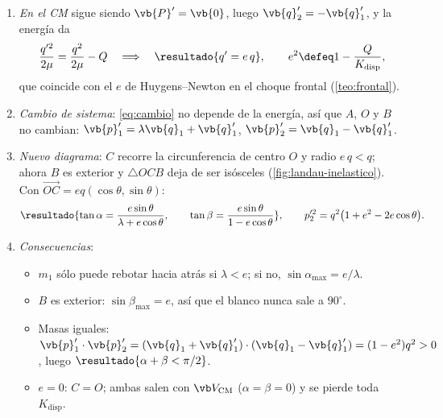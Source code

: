 \begin{resolucion}
\begin{enumerate}
  \item \emph{En el CM} sigue siendo $\vb{P}'=\vb{0}$, luego $\vb{q}_{2}'=-\vb{q}_{1}'$, y la energía da
        \[
          \frac{q'^{2}}{2\mu}=\frac{q^{2}}{2\mu}-Q
          \quad\Longrightarrow\quad
          \resultado{q'=e\,q},\qquad e^{2}\defeq1-\frac{Q}{K_{\mathrm{disp}}} ,
        \]
        que coincide con el $e$ de Huygens--Newton en el choque frontal (\cref{teo:frontal}).
  \item \emph{Cambio de sistema}: \eqref{eq:cambio} no depende de la energía, así que $A$, $O$ y $B$
        no cambian: $\vb{p}_{1}'=\lambda\vb{q}_{1}+\vb{q}_{1}'$, $\vb{p}_{2}'=\vb{q}_{1}-\vb{q}_{1}'$.
  \item \emph{Nuevo diagrama}: $C$ recorre la circunferencia de centro $O$ y radio $e\,q<q$; ahora $B$
        es exterior y $\triangle OCB$ deja de ser isósceles (\cref{fig:landau-inelastico}). Con
        $\overrightarrow{OC}=eq(\cos\theta,\sin\theta)$:
        \[
          \resultado{\tan\alpha=\frac{e\sin\theta}{\lambda+e\cos\theta},\qquad
          \tan\beta=\frac{e\sin\theta}{1-e\cos\theta}},\qquad
          p_{2}'^{2}=q^{2}\bigl(1+e^{2}-2e\cos\theta\bigr).
        \]
  \item \emph{Consecuencias}:
  \begin{itemize}[leftmargin=1.2em]
    \item $m_{1}$ sólo puede rebotar hacia atrás si $\lambda<e$; si no, $\sin\alpha_{\max}=e/\lambda$.
    \item $B$ es exterior: $\sin\beta_{\max}=e$, así que el blanco nunca sale a $90^{\circ}$.
    \item Masas iguales: $\vb{p}_{1}'\cdot\vb{p}_{2}'=(\vb{q}_{1}+\vb{q}_{1}')\cdot(\vb{q}_{1}-\vb{q}_{1}')=(1-e^{2})q^{2}>0$, luego
          $\resultado{\alpha+\beta<\pi/2}$.
    \item $e=0$: $C=O$; ambas salen con $\Vcm$ ($\alpha=\beta=0$) y se pierde toda $K_{\mathrm{disp}}$.\qedhere
  \end{itemize}
\end{enumerate}
\end{resolucion}

